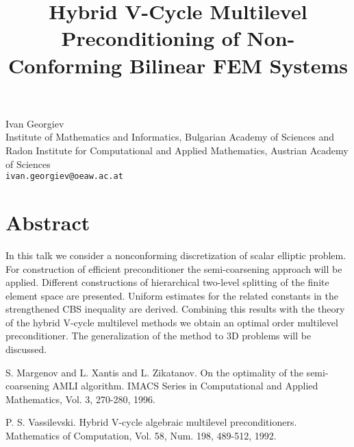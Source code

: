 \title{Hybrid V-Cycle Multilevel Preconditioning of Non-Conforming Bilinear FEM Systems}
\author{}  \institute{}
\maketitle
\begin{center}
{\large Ivan Georgiev}\\
Institute of Mathematics and Informatics, Bulgarian Academy of Sciences  and  Radon Institute for Computational and Applied Mathematics,  Austrian Academy of Sciences\\
{\tt ivan.georgiev@oeaw.ac.at}

\end{center}

\section*{Abstract}

In this talk we consider a nonconforming discretization of scalar elliptic problem. For construction of efficient preconditioner the semi-coarsening approach \cite{R1} will be applied. Different constructions of hierarchical two-level splitting of the finite element space are presented. Uniform estimates for the related constants in the strengthened CBS  inequality are derived. Combining this results with the theory of the hybrid V-cycle multilevel methods \cite{R2} we obtain an optimal order multilevel preconditioner. The generalization of the method to 3D problems will be discussed. 


\begin{thebibliography}{10}

{\sc S. Margenov and L. Xantis and L. Zikatanov}. { On the optimality of the semi-coarsening AMLI algorithm}. IMACS Series in Computational and Applied Mathematics, Vol. 3, 270-280, 1996.



{\sc  P. S. Vassilevski}. {Hybrid V-cycle algebraic multilevel preconditioners}. Mathematics of Computation, Vol. 58, Num. 198, 489-512, 1992.

\end{thebibliography}
